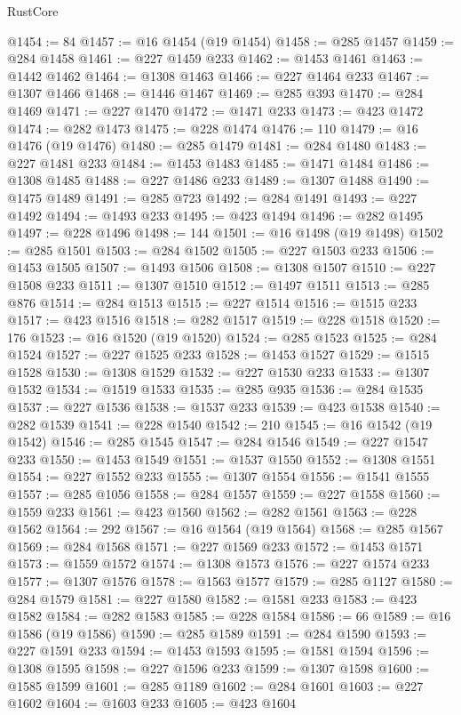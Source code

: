 \begin{lexlean}{RustCore}
\begin{coremodule}
@1454 := 84
@1457 := @16 @1454 (@19 @1454)
@1458 := @285 @1457
@1459 := @284 @1458
@1461 := @227 @1459 @233
@1462 := @1453 @1461
@1463 := @1442 @1462
@1464 := @1308 @1463
@1466 := @227 @1464 @233
@1467 := @1307 @1466
@1468 := @1446 @1467
@1469 := @285 @393
@1470 := @284 @1469
@1471 := @227 @1470
@1472 := @1471 @233
@1473 := @423 @1472
@1474 := @282 @1473
@1475 := @228 @1474
@1476 := 110
@1479 := @16 @1476 (@19 @1476)
@1480 := @285 @1479
@1481 := @284 @1480
@1483 := @227 @1481 @233
@1484 := @1453 @1483
@1485 := @1471 @1484
@1486 := @1308 @1485
@1488 := @227 @1486 @233
@1489 := @1307 @1488
@1490 := @1475 @1489
@1491 := @285 @723
@1492 := @284 @1491
@1493 := @227 @1492
@1494 := @1493 @233
@1495 := @423 @1494
@1496 := @282 @1495
@1497 := @228 @1496
@1498 := 144
@1501 := @16 @1498 (@19 @1498)
@1502 := @285 @1501
@1503 := @284 @1502
@1505 := @227 @1503 @233
@1506 := @1453 @1505
@1507 := @1493 @1506
@1508 := @1308 @1507
@1510 := @227 @1508 @233
@1511 := @1307 @1510
@1512 := @1497 @1511
@1513 := @285 @876
@1514 := @284 @1513
@1515 := @227 @1514
@1516 := @1515 @233
@1517 := @423 @1516
@1518 := @282 @1517
@1519 := @228 @1518
@1520 := 176
@1523 := @16 @1520 (@19 @1520)
@1524 := @285 @1523
@1525 := @284 @1524
@1527 := @227 @1525 @233
@1528 := @1453 @1527
@1529 := @1515 @1528
@1530 := @1308 @1529
@1532 := @227 @1530 @233
@1533 := @1307 @1532
@1534 := @1519 @1533
@1535 := @285 @935
@1536 := @284 @1535
@1537 := @227 @1536
@1538 := @1537 @233
@1539 := @423 @1538
@1540 := @282 @1539
@1541 := @228 @1540
@1542 := 210
@1545 := @16 @1542 (@19 @1542)
@1546 := @285 @1545
@1547 := @284 @1546
@1549 := @227 @1547 @233
@1550 := @1453 @1549
@1551 := @1537 @1550
@1552 := @1308 @1551
@1554 := @227 @1552 @233
@1555 := @1307 @1554
@1556 := @1541 @1555
@1557 := @285 @1056
@1558 := @284 @1557
@1559 := @227 @1558
@1560 := @1559 @233
@1561 := @423 @1560
@1562 := @282 @1561
@1563 := @228 @1562
@1564 := 292
@1567 := @16 @1564 (@19 @1564)
@1568 := @285 @1567
@1569 := @284 @1568
@1571 := @227 @1569 @233
@1572 := @1453 @1571
@1573 := @1559 @1572
@1574 := @1308 @1573
@1576 := @227 @1574 @233
@1577 := @1307 @1576
@1578 := @1563 @1577
@1579 := @285 @1127
@1580 := @284 @1579
@1581 := @227 @1580
@1582 := @1581 @233
@1583 := @423 @1582
@1584 := @282 @1583
@1585 := @228 @1584
@1586 := 66
@1589 := @16 @1586 (@19 @1586)
@1590 := @285 @1589
@1591 := @284 @1590
@1593 := @227 @1591 @233
@1594 := @1453 @1593
@1595 := @1581 @1594
@1596 := @1308 @1595
@1598 := @227 @1596 @233
@1599 := @1307 @1598
@1600 := @1585 @1599
@1601 := @285 @1189
@1602 := @284 @1601
@1603 := @227 @1602
@1604 := @1603 @233
@1605 := @423 @1604

\end{coremodule}
\end{lexlean}
